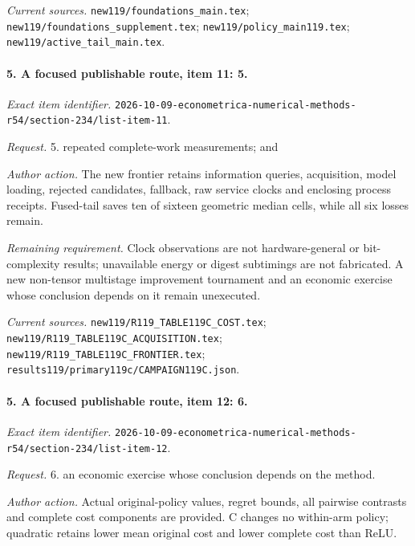 \par\emph{Current sources.} \nolinkurl{new119/foundations_main.tex}; \nolinkurl{new119/foundations_supplement.tex}; \nolinkurl{new119/policy_main119.tex}; \nolinkurl{new119/active_tail_main.tex}.

\paragraph{5. A focused publishable route, item 11: 5.}

\emph{Exact item identifier.} \nolinkurl{2026-10-09-econometrica-numerical-methods-r54/section-234/list-item-11}.

\par\emph{Request.} 5. repeated complete-work measurements; and

\par\emph{Author action.} The new frontier retains information queries, acquisition, model loading, rejected candidates, fallback, raw service clocks and enclosing process receipts. Fused-tail saves ten of sixteen geometric median cells, while all six losses remain.

\par\emph{Remaining requirement.} Clock observations are not hardware-general or bit-complexity results; unavailable energy or digest subtimings are not fabricated. A new non-tensor multistage improvement tournament and an economic exercise whose conclusion depends on it remain unexecuted.

\par\emph{Current sources.} \nolinkurl{new119/R119_TABLE119C_COST.tex}; \nolinkurl{new119/R119_TABLE119C_ACQUISITION.tex}; \nolinkurl{new119/R119_TABLE119C_FRONTIER.tex}; \nolinkurl{results119/primary119c/CAMPAIGN119C.json}.

\paragraph{5. A focused publishable route, item 12: 6.}

\emph{Exact item identifier.} \nolinkurl{2026-10-09-econometrica-numerical-methods-r54/section-234/list-item-12}.

\par\emph{Request.} 6. an economic exercise whose conclusion depends on the method.

\par\emph{Author action.} Actual original-policy values, regret bounds, all pairwise contrasts and complete cost components are provided. C changes no within-arm policy; quadratic retains lower mean original cost and lower complete cost than ReLU.

